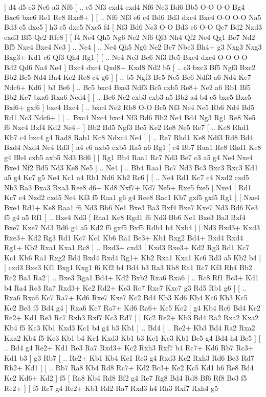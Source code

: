 \makegametitle 
|   d4   d5    e3   Nc6    a3   Nf6 [ .. e5  Nf3 exd4  exd4 Nf6  Nc3 Bd6  Bb5 O-O  O-O Bg4  Bxc6 bxc6  Re1 Re8  Rxe8+   ]  [ .. Nf6  Nf3 e6  c4 Bd6  Bd3 dxc4  Bxc4 O-O  O-O Na5  Bd3 c5  dxc5   ]  h3   e5    dxe5   Nxe5    f4 [  Nf3 Bd6  Nc3 O-O  Bd3 c6  O-O Qc7  Bd2 Nxd3  cxd3 Bf5  Qc2 Rfe8   ]  [  f4 Ne4  Qh5 Ng6  Ne2 Nf6  Qf3 Nh4  Qf2 Ne4  Qg1 Be7  Nd2 Bf5  Nxe4 Bxe4  Nc3   ] .. Nc4 [ .. Ne4  Qh5 Ng6  Ne2 Be7  Nbc3 Bh4+  g3 Nxg3  Nxg3 Bxg3+  Kd1 c6  Qf3 Qh4  Rg1   ]  [ .. Nc4  Nc3 Be6  Nf3 Bc5  Bxc4 dxc4  O-O O-O  Bd2 Qd6  Na4 Ne4   ]  Bxc4   dxc4    Qxd8+   Kxd8   Nd2   b5 [ .. c3  bxc3 Bf5  Ngf3 Bxc2  Bb2 Bc5  Nd4 Ba4  Ke2 Re8  c4 g6   ]  [ .. b5  Ngf3 Bc5  Ne5 Be6  Ndf3 a6  Nd4 Ke7  Ndc6+ Kd6   ]  b3   Be6 [ .. Bc5  bxc4 Bxe3  Ndf3 Bc5  cxb5 Re8+  Ne2 a6  Rb1 Bf5  Bb2 Ke7  bxa6 Rxa6  Ned4   ]  [ .. Be6  Ne2 cxb3  cxb3 a5  Bb2 a4  b4 c5  bxc5 Bxc5  Bxf6+ gxf6   ]  bxc4   Bxc4 [ .. bxc4  Ne2 Rb8  O-O Bc5  Nf3 Ne4  Ne5 Rb6  Nd4 Bd5  Rd1 Nc3  Ndc6+   ]  [ .. Bxc4  Nxc4 bxc4  Nf3 Bd6  Bb2 Ne4  Bd4 Ng3  Rg1 Re8  Ne5 f6  Nxc4 Bxf4  Kd2 Ne4+   ]  Bb2   Bd5    Ngf3   Bc5    Ke2   Re8    Ne5   Re7 [ .. Kc8  Rhd1 Kb7  c4 bxc4  g4 Rad8  Rab1 Kc8  Ndxc4 Ne4   ]  [ .. Re7  Rhd1 Ke8  Ndf3 Rd8  Bd4 Bxd4  Nxd4 Ne4  Rd3   ]  a4   c6    axb5   cxb5    Ra5   a6    Rg1 [  c4 Bb7  Raa1 Rc8  Rhd1 Ke8  g4 Bb4  cxb5 axb5  Nd3 Bd6   ]  [  Rg1 Bb4  Raa1 Rc7  Nd3 Be7  c3 a5  g4 Ne4  Nxe4 Bxe4  Nf2 Bd5  Nd3 Ke8  Ne5   ] .. Ne4 [ .. Bb4  Raa1 Rc7  Nd3 Bc3  Bxc3 Rxc3  Kd1 a5  g4 Kc7  g5 Ne4  Kc1 a4  Rb1 Nd6  Kb2 Rc6   ]  [ .. Ne4  Rd1 Kc7  c4 Nxd2  cxd5 Nb3  Ra3 Bxa3  Bxa3 Ree8  d6+ Kd8  Nxf7+ Kd7  Ne5+ Rxe5  fxe5   ]  Nxe4 [  Rd1 Kc7  c4 Nxd2  cxd5 Ne4  Kf3 f5  Raa1 g6  g4 Ree8  Rac1 Kb7  gxf5 gxf5  Rg1   ]  [  Nxe4 Bxe4  Rd1+ Ke8  Raa1 f6  Nd3 Bb6  Ne1 Bxe3  Ba3 Bxf4  Bxe7 Kxe7  Nd3 Bd6  Ke3 f5  g4 a5  Rf1   ] .. Bxe4    Nd3 [  Raa1 Ke8  Rgd1 f6  Nd3 Bb6  Ne1 Bxe3  Ba3 Bxf4  Bxe7 Kxe7  Nd3 Bd6  g4 a5  Kd2 f5  gxf5 Bxf5  Rdb1 b4  Nxb4   ]  [  Nd3 Bxd3+  Kxd3 Rxe3+  Kd2 Rg3  Rd1 Kc7  Kc1 Kb6  Ra1 Be3+  Kb1 Rxg2  Bd4+ Bxd4  Rxd4 Rg1+  Kb2 Rxa1  Kxa1 Rc8   ] .. Bxd3+    cxd3 [  Kxd3 Rxe3+  Kd2 Rg3  Rd1 Kc7  Kc1 Kb6  Ra1 Rxg2  Bd4 Bxd4  Rxd4 Rg1+  Kb2 Rxa1  Kxa1 Kc6  Rd3 a5  Kb2 b4   ]  [  cxd3 Bxe3  Kf1 Bxg1  Kxg1 f6  Kf2 b4  Bd4 b3  Ra3 Rb8  Ra1 Rc7  Kf3 Rb4  Bb2 Rc2  Ba3 Ra2   ] .. Bxe3    Rga1   Bd4+    Kd2   Bxb2    Rxa6   Rxa6 [ .. Rc8  Rf1 Bc3+  Kd1 b4  Ra4 Re3  Ra7 Rxd3+  Ke2 Rd2+  Ke3 Rc7  Rxc7 Kxc7  g3 Rd5  Rb1 g6   ]  [ .. Rxa6  Rxa6 Kc7  Ra7+ Kd6  Rxe7 Kxe7  Kc2 Bd4  Kb3 Kd6  Kb4 Kc6  Kb3 Kc5  Kc2 Be3  f5 Bd4  g4   ]  Rxa6   Kc7    Ra7+   Kd6    Ra6+   Kc5    Kc2 [  g4 Kb4  Rc6 Bd4  Kc2 Re2+  Kd1 Re3  Rc7 Rxh3  Rxf7 Kc3  Rd7   ]  [  Kc2 Re2+  Kb3 Bd4  Ra2 Rxa2  Kxa2 Kb4  f5 Kc3  Kb1 Kxd3  Kc1 b4  g4 b3  Kb1   ] .. Bd4 [ .. Re2+  Kb3 Bd4  Ra2 Rxa2  Kxa2 Kb4  f5 Kc3  Kb1 b4  Kc1 Kxd3  Kb1 b3  Kc1 Kc3  Kb1 Be5  g4 Bd4  h4 Be5   ]  [ .. Bd4  g4 Re2+  Kd1 Re3  Ra7 Rxd3+  Kc2 Rxh3  Rxf7 b4  Rc7+ Kd6  Rb7 Rc3+  Kd1 b3   ]  g3   Rb7 [ .. Re2+  Kb1 Kb4  Kc1 Re3  g4 Rxd3  Kc2 Rxh3  Rd6 Be3  Rd7 Rh2+  Kd1   ]  [ .. Rb7  Ra8 Kb4  Rd8 Rc7+  Kd2 Bc3+  Ke2 Kc5  Kd1 h6  Re8 Bd4  Kc2 Kd6+  Kd2   ]  f5 [  Ra8 Kb4  Rd8 Bf2  g4 Re7  Rg8 Bd4  Rd8 Bf6  Rf8 Bc3  f5 Re2+   ]  [  f5 Re7  g4 Re2+  Kb1 Rd2  Ra7 Rxd3  h4 Rh3  Rxf7 Rxh4  g5 